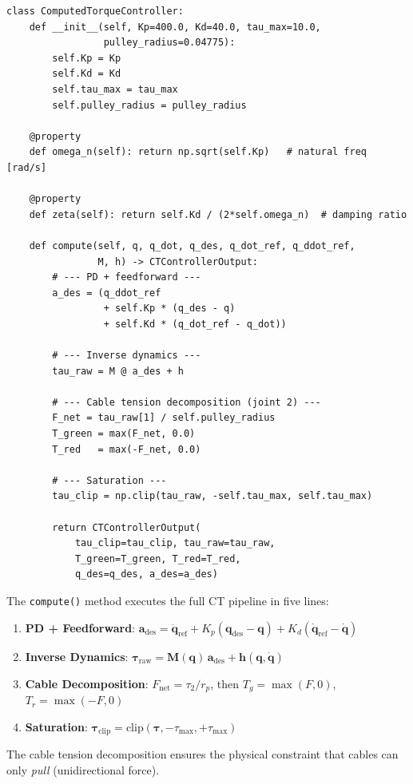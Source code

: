 \documentclass[11pt,a4paper]{article}
\newcommand{\bq}{\bm{q}}
\newcommand{\bdq}{\dot{\bm{q}}}
\newcommand{\bddq}{\ddot{\bm{q}}}
\newcommand{\btau}{\bm{\tau}}
\newcommand{\bM}{\bm{M}}
\newcommand{\bh}{\bm{h}}
\begin{document}
\begin{lstlisting}[caption={Pure NumPy CT controller --- \texttt{rl/computed\_torque\_controller.py}}]
class ComputedTorqueController:
    def __init__(self, Kp=400.0, Kd=40.0, tau_max=10.0,
                 pulley_radius=0.04775):
        self.Kp = Kp
        self.Kd = Kd
        self.tau_max = tau_max
        self.pulley_radius = pulley_radius

    @property
    def omega_n(self): return np.sqrt(self.Kp)   # natural freq [rad/s]

    @property
    def zeta(self): return self.Kd / (2*self.omega_n)  # damping ratio

    def compute(self, q, q_dot, q_des, q_dot_ref, q_ddot_ref,
                M, h) -> CTControllerOutput:
        # --- PD + feedforward ---
        a_des = (q_ddot_ref
                 + self.Kp * (q_des - q)
                 + self.Kd * (q_dot_ref - q_dot))

        # --- Inverse dynamics ---
        tau_raw = M @ a_des + h

        # --- Cable tension decomposition (joint 2) ---
        F_net = tau_raw[1] / self.pulley_radius
        T_green = max(F_net, 0.0)
        T_red   = max(-F_net, 0.0)

        # --- Saturation ---
        tau_clip = np.clip(tau_raw, -self.tau_max, self.tau_max)

        return CTControllerOutput(
            tau_clip=tau_clip, tau_raw=tau_raw,
            T_green=T_green, T_red=T_red,
            q_des=q_des, a_des=a_des)
\end{lstlisting}

\begin{codemath}
The \texttt{compute()} method executes the full CT pipeline in five lines:
\begin{enumerate}
    \item \textbf{PD + Feedforward}: $\bm{a}_{\mathrm{des}} = \bddq_{\mathrm{ref}} + K_p(\bq_{\mathrm{des}} - \bq) + K_d(\bdq_{\mathrm{ref}} - \bdq)$
    \item \textbf{Inverse Dynamics}: $\btau_{\mathrm{raw}} = \bM(\bq)\,\bm{a}_{\mathrm{des}} + \bh(\bq, \bdq)$
    \item \textbf{Cable Decomposition}: $F_{\mathrm{net}} = \tau_2 / r_p$, then $T_g = \max(F,0)$, $T_r = \max(-F,0)$
    \item \textbf{Saturation}: $\btau_{\mathrm{clip}} = \mathrm{clip}(\btau, -\tau_{\max}, +\tau_{\max})$
\end{enumerate}
The cable tension decomposition ensures the physical constraint that cables can only \emph{pull} (unidirectional force).
\end{codemath}
\end{document}
